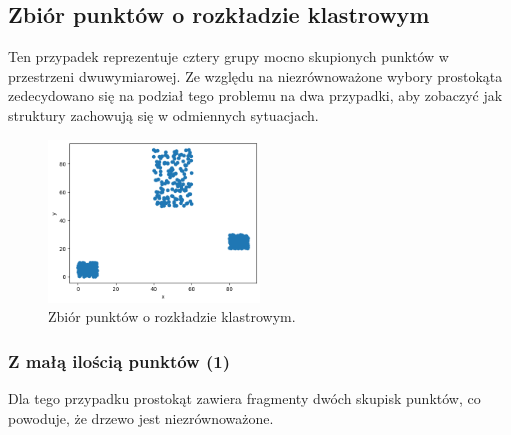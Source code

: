 \documentclass{lab}
\begin{document}
\subsection{Zbiór punktów o rozkładzie klastrowym}
Ten przypadek reprezentuje cztery grupy mocno skupionych punktów w przestrzeni dwuwymiarowej.
Ze względu na niezrównoważone wybory prostokąta zedecydowano się na podział tego problemu na dwa przypadki, aby zobaczyć jak struktury zachowują się w odmiennych sytuacjach.

\begin{figure}[H]
  \centering
  \includegraphics[width=0.5\textwidth]{resources/cluster.png}
  \caption{Zbiór punktów o rozkładzie klastrowym.}
  \label{fig:cluster}
\end{figure}

\subsubsection{Z małą ilością punktów (1)}
Dla tego przypadku prostokąt zawiera fragmenty dwóch skupisk punktów, co powoduje, że drzewo jest niezrównoważone.
\end{document}
